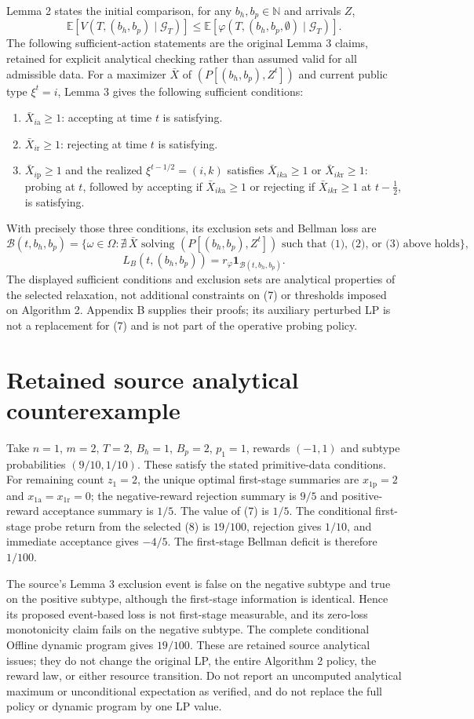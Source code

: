 \documentclass{article}
\begin{document}
Lemma 2 states the initial comparison, for any $b_h,b_p\in\mathbb N$ and arrivals $Z$,
\[
\mathbb E[V(T,(b_h,b_p)\mid\mathcal G_T)]
\le\mathbb E[\varphi(T,(b_h,b_p,\emptyset)\mid\mathcal G_T)].
\]
The following sufficient-action statements are the original Lemma 3 claims, retained for explicit analytical checking rather than assumed valid for all admissible data. For a maximizer $\bar X$ of $(P[(b_h,b_p),Z^t])$ and current public type $\xi^t=i$, Lemma 3 gives the following sufficient conditions:
\begin{enumerate}
\item $\bar X_{i\mathrm a}\ge1$: accepting at time $t$ is satisfying.
\item $\bar X_{i\mathrm r}\ge1$: rejecting at time $t$ is satisfying.
\item $\bar X_{i\mathrm p}\ge1$ and the realized $\xi^{t-1/2}=(i,k)$ satisfies $\bar X_{ik\mathrm a}\ge1$ or $\bar X_{ik\mathrm r}\ge1$: probing at $t$, followed by accepting if $\bar X_{ik\mathrm a}\ge1$ or rejecting if $\bar X_{ik\mathrm r}\ge1$ at $t-\tfrac12$, is satisfying.
\end{enumerate}
With precisely those three conditions, its exclusion sets and Bellman loss are
\[
\mathcal B(t,b_h,b_p)=
\{\omega\in\Omega:\nexists\,\bar X\text{ solving }(P[(b_h,b_p),Z^t])
\text{ such that (1), (2), or (3) above holds}\},
\]
\[
L_B(t,(b_h,b_p))=r_\varphi\mathbf1_{\mathcal B(t,b_h,b_p)}.
\]
The displayed sufficient conditions and exclusion sets are analytical properties of the selected relaxation, not additional constraints on (7) or thresholds imposed on Algorithm 2. Appendix B supplies their proofs; its auxiliary perturbed LP is not a replacement for (7) and is not part of the operative probing policy.

\section*{Retained source analytical counterexample}
Take $n=1$, $m=2$, $T=2$, $B_h=1$, $B_p=2$, $p_1=1$, rewards $(-1,1)$ and subtype probabilities $(9/10,1/10)$. These satisfy the stated primitive-data conditions. For remaining count $z_1=2$, the unique optimal first-stage summaries are $x_{1\mathrm p}=2$ and $x_{1\mathrm a}=x_{1\mathrm r}=0$; the negative-reward rejection summary is $9/5$ and positive-reward acceptance summary is $1/5$. The value of (7) is $1/5$. The conditional first-stage probe return from the selected (8) is $19/100$, rejection gives $1/10$, and immediate acceptance gives $-4/5$. The first-stage Bellman deficit is therefore $1/100$.

The source's Lemma 3 exclusion event is false on the negative subtype and true on the positive subtype, although the first-stage information is identical. Hence its proposed event-based loss is not first-stage measurable, and its zero-loss monotonicity claim fails on the negative subtype. The complete conditional Offline dynamic program gives $19/100$. These are retained source analytical issues; they do not change the original LP, the entire Algorithm 2 policy, the reward law, or either resource transition. Do not report an uncomputed analytical maximum or unconditional expectation as verified, and do not replace the full policy or dynamic program by one LP value.
\end{document}
